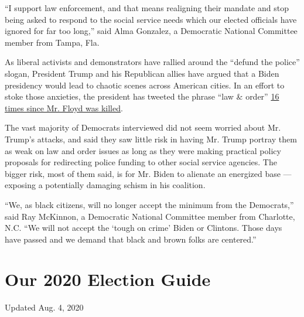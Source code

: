 ``I support law enforcement, and that means realigning their mandate and
stop being asked to respond to the social service needs which our
elected officials have ignored for far too long,'' said Alma Gonzalez, a
Democratic National Committee member from Tampa, Fla.

As liberal activists and demonstrators have rallied around the ``defund
the police'' slogan, President Trump and his Republican allies have
argued that a Biden presidency would lead to chaotic scenes across
American cities. In an effort to stoke those anxieties, the president
has tweeted the phrase ``law \& order''
\href{https://twitter.com/search?q=Law\%20Order\%20(from\%3Arealdonaldtrump)\&src=typed_query\&f=live}{16
times since Mr. Floyd was killed}.

The vast majority of Democrats interviewed did not seem worried about
Mr. Trump's attacks, and said they saw little risk in having Mr. Trump
portray them as weak on law and order issues as long as they were making
practical policy proposals for redirecting police funding to other
social service agencies. The bigger risk, most of them said, is for Mr.
Biden to alienate an energized base --- exposing a potentially damaging
schism in his coalition.

``We, as black citizens, will no longer accept the minimum from the
Democrats,'' said Ray McKinnon, a Democratic National Committee member
from Charlotte, N.C. ``We will not accept the `tough on crime' Biden or
Clintons. Those days have passed and we demand that black and brown
folks are centered.''

\hypertarget{our-2020-election-guide}{%
\section{Our 2020 Election Guide}\label{our-2020-election-guide}}

Updated Aug. 4, 2020

